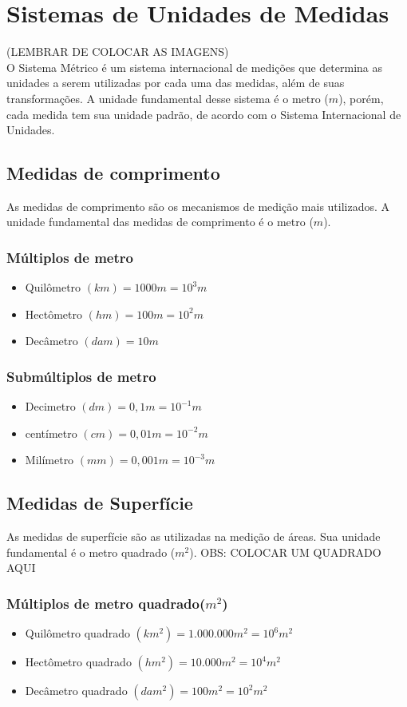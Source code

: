 \chapter{Sistemas de Unidades de Medidas}
(LEMBRAR DE COLOCAR AS IMAGENS)
\\O Sistema Métrico é um sistema internacional de medições que determina as unidades a serem utilizadas por cada uma das medidas, além de suas transformações. A unidade fundamental desse sistema é o metro ($m$), porém, cada medida tem sua unidade padrão, de acordo com o Sistema Internacional de Unidades. 

\section{Medidas de comprimento}
As medidas de comprimento são os mecanismos de medição mais utilizados. A unidade fundamental das medidas de comprimento é o metro ($m$). 
	\subsection{Múltiplos de metro}
		\begin{itemize}
			\item Quilômetro $(km) = 1000m = 10^3m$
			\item Hectômetro $(hm) = 100m = 10^2m$
			\item Decâmetro $(dam) = 10m$ 
			
		\end{itemize}

	\subsection{Submúltiplos de metro}
		\begin{itemize}
			\item Decimetro $(dm) = 0,1m = 10^{-1}m$
			\item centímetro $(cm) = 0,01m = 10^{-2}m$
			\item Milímetro $(mm) = 0,001m = 10^{-3}m$
		\end{itemize}
\section{Medidas de Superfície}
As medidas de superfície são as utilizadas na medição de
áreas. Sua unidade fundamental é o metro quadrado ($m^2$).
OBS: COLOCAR UM QUADRADO AQUI
	\subsection{Múltiplos de metro quadrado($m^2$)}
		\begin{itemize}
			\item Quilômetro quadrado $(km^2) = 1.000.000 m^2 = 10^6 m^2$
			\item Hectômetro quadrado $(hm^2) = 10.000 m^2 = 10^4 m^2$
			\item Decâmetro quadrado $(dam^2) = 100 m^2 = 10^2 m^2$
		\end{itemize}

